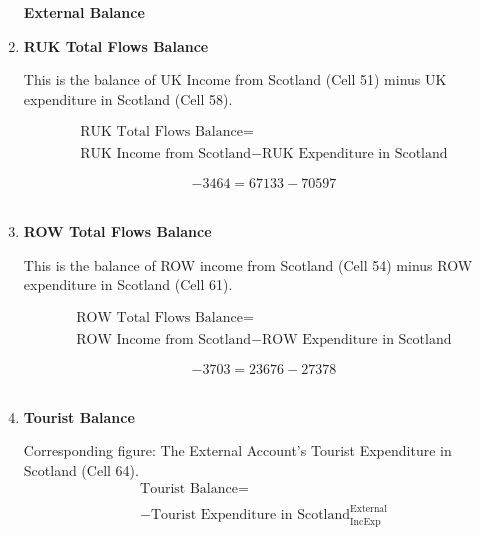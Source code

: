 \begin{enumerate}
\newpage

\begin{center}
\textbf{\LARGE External Balance}
\end{center}

\item \textbf {RUK Total Flows Balance}

This is the balance of UK Income from Scotland (Cell 51) minus UK expenditure in Scotland (Cell 58).

\begin{equation}
\begin{split}
\text{RUK Total Flows Balance} =  \\ \\
\text{RUK Income from Scotland}- \text{RUK Expenditure in Scotland}
\end{split} \label{eq:2.5.76}
\end{equation}

\begin{equation} \nonumber
-3464 = 67133-70597
\end{equation}\\


\item \textbf {ROW Total Flows Balance}

This is the balance of ROW income from Scotland (Cell 54) minus ROW expenditure in Scotland (Cell 61).

\begin{equation}
\begin{split}
\text{ROW Total Flows Balance} =  \\ \\
\text{ROW Income from Scotland}- \text{ROW Expenditure in Scotland}
\end{split} \label{eq:2.5.77}
\end{equation}

\begin{equation} \nonumber
-3703 = 23676-27378
\end{equation}\\


\item \textbf {Tourist Balance}

Corresponding figure: The External Account's Tourist Expenditure in Scotland (Cell 64).\\

\begin{equation}
\begin{split}
\text{Tourist Balance} =  \\ \\
-\text{Tourist Expenditure in Scotland}^\text{External}_\text{IncExp}
\end{split} \label{eq:2.5.78}
\end{equation}


\end{enumerate}
